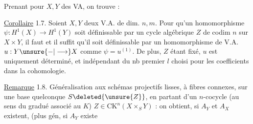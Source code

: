  Prenant pour $X,Y$ des VA, on trouve :

\uline{Corollaire} 1.7.  Soient $X,Y$ deux V.A. de dim. $n,m$. Pour qu'un homomorphisme $\psi:H^1(X)\longrightarrow H^1(Y)$ soit définissable par un cycle algébrique $Z$ de  codim $n$ sur $X\times Y$, il faut et il suffit qu'il soit définissable par un homomorphisme de V.A. $u:Y\unsure{-|\longrightarrow}X$ comme $\psi=u^{(1)}$. De plus, $Z$ étant fixé,  $u$ est uniquement déterminé, et indépendant du nb premier $l$ choisi pour les coefficients dans la cohomologie.

\uline{Remarque} 1.8. Généralisation  aux schémas projectifs lisses, à fibres  connexes, sur une base quelconque $S\deleted{\unsure{Z}}$, en partant d'un $n$-cocycle (au sens du  gradué associé au $K$) $Z\in{\mathrm{CK}}^n(X\times_S Y)$ : on obtient, si $A_Y$ et $A_X$ existent, (plus gén, si $A_Y$ existe
